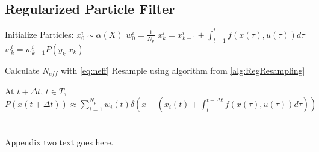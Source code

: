 \documentclass[journal]{./IEEEtran}
\begin{document}
\subsection{Regularized Particle Filter}
\label{alg:RegularizedParticleFilter}
\begin{algorithm}
\begin{algorithmic}
\STATE Initialize Particles:
    \STATE $x^i_0  \sim \alpha(X)$
    \STATE $w^i_0 = \frac{1}{N_p}$
\ENDFOR
{}
        \STATE $x^i_k = x^i_{k-1} + \int_{t-1}^t f(x(\tau), u(\tau)) d\tau $
        \STATE $w^i_k = w^i_{k-1}P(y_k | x_k)$
    \ENDFOR

    \STATE Calculate $N_{eff}$ with \autoref{eq:neff}
        \STATE Resample using algorithm from \autoref{alg:RegResampling}
    \ENDIF
\ENDFOR

\STATE At $t + \Delta t$, $t \in T$, $P(x(t+\Delta t)) \approx 
\sum_{i=1}^{N_p} w_i(t)\delta\left(x - (x_i(t) + \int_t^{t+\Delta t} f(x(\tau), u(\tau)) d\tau) \right)$
 \end{algorithmic}
 \end{algorithm}

\section{}
Appendix two text goes here.





\end{document}
